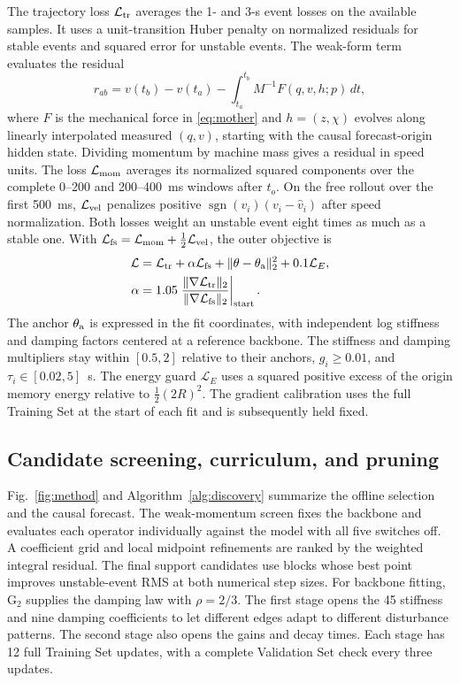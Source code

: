 \documentclass[journal]{IEEEtran}
\newcommand{\op}[1]{\ensuremath{\mathrm{G}_{#1}}}
\begin{document}
The trajectory loss \(\mathcal L_{\rm tr}\) averages the 1- and 3-s
event losses on the available samples. It uses a unit-transition Huber
penalty on normalized residuals for stable events and squared error for
unstable events. The weak-form term evaluates the residual
\begin{equation}
 r_{ab}=v(t_b)-v(t_a)
       -\int_{t_a}^{t_b}M^{-1}F(q,v,h;p)\,dt,
 \label{eq:weak_momentum}
\end{equation}
where \(F\) is the mechanical force in \eqref{eq:mother} and \(h=(z,\chi)\)
evolves along linearly interpolated measured \((q,v)\), starting with
the causal forecast-origin hidden state. Dividing momentum by machine mass
gives a residual in speed units. The loss \(\mathcal L_{\rm mom}\) averages
its normalized squared components over the complete 0--200 and
200--400~ms windows after \(t_o\). On the free rollout over the first
500~ms, \(\mathcal L_{\rm vel}\) penalizes positive
\(\operatorname{sgn}(v_i)(v_i-\hat v_i)\) after speed normalization.
Both losses weight an unstable event eight times as much as a stable one.
With \(\mathcal L_{\rm fs}=\mathcal L_{\rm mom}+\tfrac12\mathcal L_{\rm vel}\),
the outer objective is
\begin{equation}
 \begin{aligned}
 \mathcal L&=\mathcal L_{\rm tr}+\alpha\mathcal L_{\rm fs}
                 +\|\theta-\theta_{\rm a}\|_2^2+0.1\mathcal L_E,\\
 \alpha&=1.05\left.
          \frac{\|\nabla\mathcal L_{\rm tr}\|_2}{\|\nabla\mathcal L_{\rm fs}\|_2}
          \right|_{\rm start}.
 \end{aligned}
 \label{eq:loss}
\end{equation}
The anchor \(\theta_{\rm a}\) is expressed in the fit coordinates, with
independent log stiffness and damping factors centered at a reference
backbone. The stiffness and damping multipliers stay within \([0.5,2]\)
relative to their anchors, \(g_i\ge0.01\), and
\(\tau_i\in[0.02,5]\)~s. The energy guard \(\mathcal L_E\) uses a squared
positive excess of the origin memory energy relative to
\(\tfrac12(2R)^2\). The gradient calibration uses the full Training Set
at the start of each fit and is subsequently held fixed.

\subsection{Candidate screening, curriculum, and pruning}
Fig.~\ref{fig:method} and Algorithm~\ref{alg:discovery} summarize the
offline selection and the causal forecast. The weak-momentum screen fixes
the backbone and evaluates each operator individually against the model
with all five switches off. A coefficient grid and local midpoint refinements
are ranked by the weighted integral residual. The final support candidates
use blocks whose best point improves unstable-event RMS at both numerical
step sizes. For backbone fitting, \(\op{2}\) supplies the damping law with
\(\rho=2/3\). The first stage opens the 45 stiffness and nine damping
coefficients to let different edges adapt to different disturbance
patterns. The second stage also opens the gains and decay times.
Each stage has 12 full Training Set updates, with a complete Validation
Set check every three updates.
\end{document}
